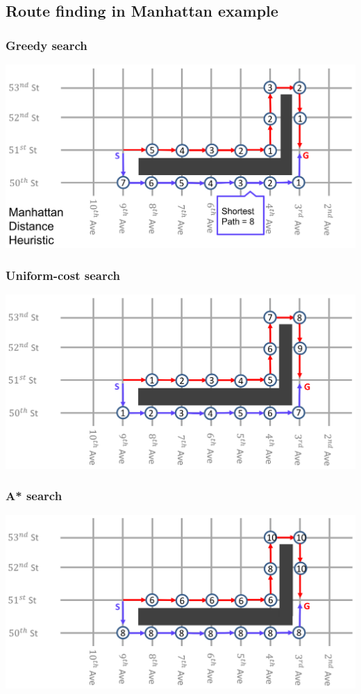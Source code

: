 \documentclass[11pt]{article}
\begin{document}
\subsection{Route finding in Manhattan example}
\label{sec:org0d834ba}

\subsubsection{Greedy search}
\label{sec:orgf6a00c2}
\begin{center}
\includegraphics[width=.9\linewidth]{./images/route-finding-in-manhattan-example-greedy-search.png}
\end{center}
\subsubsection{Uniform-cost search}
\label{sec:org72f8d74}
\begin{center}
\includegraphics[width=.9\linewidth]{./images/route-finding-in-manhattan-example-uniform-cost-search.png}
\end{center}
\subsubsection{A* search}
\label{sec:org7495b24}
\begin{center}
\includegraphics[width=.9\linewidth]{./images/route-finding-in-manhattan-example-a-star-search.png}
\end{center}
\end{document}

